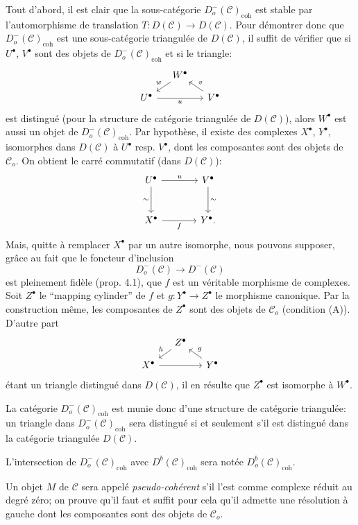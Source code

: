 \documentclass[11pt]{article}
\providecommand{\coh}{\mathrm{coh}}
\providecommand{\cC}{\mathcal C}
\providecommand{\cC}{\mathcal C}
\providecommand{\coh}{\mathrm{coh}}
\begin{document}
Tout d'abord, il est clair que la sous-catégorie $D_o^-(\cC)_{\coh}$ est stable par l'automorphisme de translation $T:D(\cC)\to D(\cC)$. Pour démontrer donc que $D_o^-(\cC)_{\coh}$ est une sous-catégorie triangulée de $D(\cC)$, il suffit de vérifier que si $U^\bullet$, $V^\bullet$ sont des objets de $D_o^-(\cC)_{\coh}$ et si le triangle:
\[
\begin{tikzcd}[column sep=small,row sep=small]
& W^\bullet \arrow[dl,"w"']\\
U^\bullet \arrow[rr,"u"']&& V^\bullet \arrow[ul,"v"']
\end{tikzcd}
\]
est distingué (pour la structure de catégorie triangulée de $D(\cC)$), alors $W^\bullet$ est aussi un objet de $D_o^-(\cC)_{\coh}$. Par hypothèse, il existe des complexes $X^\bullet$, $Y^\bullet$, isomorphes dans $D(\cC)$ à $U^\bullet$ resp. $V^\bullet$, dont les composantes sont des objets de $\cC_o$. On obtient le carré
commutatif (dans $D(\cC)$):
\[
\begin{tikzcd}[column sep=large,row sep=large]
U^\bullet \arrow[r,"u"] \arrow[d,"\sim"']&V^\bullet \arrow[d,"\sim"]\\
X^\bullet \arrow[r,"f"']&Y^\bullet .
\end{tikzcd}
\]
Mais, quitte à remplacer $X^\bullet$ par un autre isomorphe, nous pouvons supposer, grâce au fait que le foncteur d'inclusion
\[
D_o^-(\cC)\longrightarrow D^-(\cC)
\]
est pleinement fidèle (prop. 4.1), que $f$ est un véritable morphisme de complexes. Soit $Z^\bullet$ le ``mapping cylinder'' de $f$ et $g:Y^\bullet\to Z^\bullet$ le morphisme canonique. Par la construction même, les composantes de $Z^\bullet$ sont des objets de $\cC_o$ (condition (A)). D'autre part
\[
\begin{tikzcd}[column sep=small,row sep=small]
&Z^\bullet \arrow[dl,"h"']\\
X^\bullet \arrow[rr]&&Y^\bullet \arrow[ul,"g"']
\end{tikzcd}
\]
étant un triangle distingué dans $D(\cC)$, il en résulte que $Z^\bullet$ est isomorphe à $W^\bullet$.

La catégorie $D_o^-(\cC)_{\coh}$ est munie donc d'une structure de catégorie triangulée: un triangle dans $D_o^-(\cC)_{\coh}$ sera distingué si et seulement s'il est distingué dans la catégorie triangulée $D(\cC)$.

L'intersection de $D_o^-(\cC)_{\coh}$ avec $D^b(\cC)_{\coh}$ sera notée $D_o^b(\cC)_{\coh}$.

Un objet $M$ de $\cC$ sera appelé \emph{pseudo-cohérent} s'il l'est comme complexe réduit au degré zéro; on prouve qu'il faut et suffit 
pour
cela qu'il admette une résolution à gauche dont les composantes sont des objets de $\cC_o$.
\end{document}
